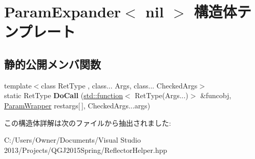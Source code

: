 \hypertarget{struct_param_expander_3_01nil_01_4}{}\section{Param\+Expander$<$ nil $>$ 構造体テンプレート}
\label{struct_param_expander_3_01nil_01_4}
\subsection*{静的公開メンバ関数}
\begin{DoxyCompactItemize}
\item 
{\footnotesize template$<$class Ret\+Type , class... Args, class... Checked\+Args$>$ }\\static Ret\+Type {\bfseries Do\+Call} (\hyperlink{classstd_1_1function}{std\+::function}$<$ Ret\+Type(Args...)$>$ \&funcobj, \hyperlink{struct_param_wrapper}{Param\+Wrapper} restargs\mbox{[}$\,$\mbox{]}, Checked\+Args...\+args)\hypertarget{struct_param_expander_3_01nil_01_4_a11b074d2a571c86dd29679a23774ee3b}{}\label{struct_param_expander_3_01nil_01_4_a11b074d2a571c86dd29679a23774ee3b}

\end{DoxyCompactItemize}


この構造体詳解は次のファイルから抽出されました\+:\begin{DoxyCompactItemize}
\item 
C\+:/\+Users/\+Owner/\+Documents/\+Visual Studio 2013/\+Projects/\+Q\+G\+J2015\+Spring/Reflector\+Helper.\+hpp\end{DoxyCompactItemize}
